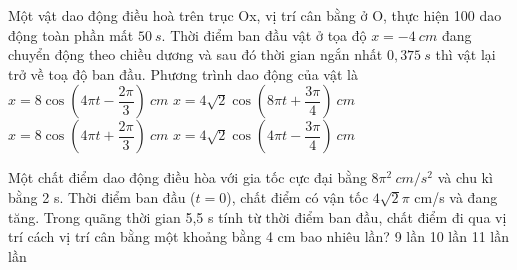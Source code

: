 \begin{ex}%
Một vật dao động điều hoà trên trục Ox, vị trí cân bằng ở O, thực hiện 100 dao động toàn phần mất $50\ s$. Thời điểm ban đầu vật ở tọa độ $x=-4\ cm$ đang chuyển động theo chiều dương và sau đó thời gian ngắn nhất $0,375\ s$ thì vật lại trở về toạ độ ban đầu. Phương trình dao động của vật là 
\choice 
{$x=8\cos \left( 4\pi t-\dfrac{2\pi}{3} \right)\ cm$} 
{$x=4\sqrt{2}\cos \left( 8\pi t+\dfrac{3\pi}{4} \right)\ cm$} 
{$x=8\cos \left( 4\pi t+\dfrac{2\pi}{3} \right)\ cm$} 
{\True $x=4\sqrt{2}\cos \left( 4\pi t-\dfrac{3\pi}{4} \right)\ cm$} 
\end{ex} 
\begin{ex}%
Một chất điểm dao động điều hòa với gia tốc cực đại bằng $8\pi^2\ cm/s^2$ và chu kì bằng 2 s. Thời điểm ban đầu ($t=0$), chất điểm có vận tốc $4\sqrt{2}\pi$ cm/s và đang tăng. Trong quãng thời gian 5,5 s tính từ thời điểm ban đầu, chất điểm đi qua vị trí cách vị trí cân bằng một khoảng bằng 4 cm bao nhiêu lần?
\choice
{9 lần}
{10 lần}
{11 lần}
{ lần}
\end{ex} 
